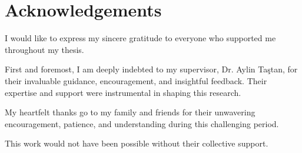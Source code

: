 \chapter*{Acknowledgements} %

I would like to express my sincere gratitude to everyone who supported me throughout my thesis. 

First and foremost, I am deeply indebted to my supervisor, Dr. Aylin Taştan, for their invaluable guidance, encouragement, and insightful feedback. Their expertise and support were instrumental in shaping this research.

My heartfelt thanks go to my family and friends for their unwavering encouragement, patience, and understanding during this challenging period. 

This work would not have been possible without their collective support.

